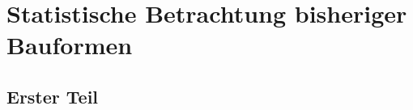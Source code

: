 \chapter{Statistische Betrachtung bisheriger Bauformen}\label{cha:Statistische Betrachtung bisheriger Bauformen}

\section{Erster Teil}
